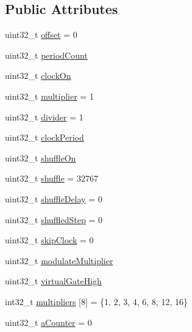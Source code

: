 \subsection*{Public Attributes}
\begin{DoxyCompactItemize}
\item 
uint32\+\_\+t \mbox{\hyperlink{class_dual_euclidean_a2dddcba8d52c9deba965c7751866c85f}{offset}} = 0
\item 
uint32\+\_\+t \mbox{\hyperlink{class_dual_euclidean_a64fd4a846ef9448e45ed252f0c272b59}{period\+Count}}
\item 
uint32\+\_\+t \mbox{\hyperlink{class_dual_euclidean_ad11fa3c6d1303467ebffae617dda5cc8}{clock\+On}}
\item 
uint32\+\_\+t \mbox{\hyperlink{class_dual_euclidean_a7ef5ab9221f00262bf015f7a67663f3e}{multiplier}} = 1
\item 
uint32\+\_\+t \mbox{\hyperlink{class_dual_euclidean_a9f1e0d3ea0d236c36c9ec259b4af6320}{divider}} = 1
\item 
uint32\+\_\+t \mbox{\hyperlink{class_dual_euclidean_a358adc877f7d9c9baa67928d75a667d2}{clock\+Period}}
\item 
uint32\+\_\+t \mbox{\hyperlink{class_dual_euclidean_a10b8d6a00cc86bde18bd612619138724}{shuffle\+On}}
\item 
uint32\+\_\+t \mbox{\hyperlink{class_dual_euclidean_a19521a4f42d79dcf5c88c02acb8fcc30}{shuffle}} = 32767
\item 
uint32\+\_\+t \mbox{\hyperlink{class_dual_euclidean_a3573c1d5e5484ebfccfad19b17aa5113}{shuffle\+Delay}} = 0
\item 
uint32\+\_\+t \mbox{\hyperlink{class_dual_euclidean_ab17ea18eb5504cffd255fbd926d3f41d}{shuffled\+Step}} = 0
\item 
uint32\+\_\+t \mbox{\hyperlink{class_dual_euclidean_a0cee123dd1067d2144f9c3c53e1d4707}{skip\+Clock}} = 0
\item 
uint32\+\_\+t \mbox{\hyperlink{class_dual_euclidean_aad2c789fc10f9bb42e36ade714cf8e32}{modulate\+Multiplier}}
\item 
uint32\+\_\+t \mbox{\hyperlink{class_dual_euclidean_a178d24471a08efe6149529d86b05fa1d}{virtual\+Gate\+High}}
\item 
int32\+\_\+t \mbox{\hyperlink{class_dual_euclidean_aab693c769cf1137e20e1b4db05ad1404}{multipliers}} \mbox{[}8\mbox{]} = \{1, 2, 3, 4, 6, 8, 12, 16\}
\item 
uint32\+\_\+t \mbox{\hyperlink{class_dual_euclidean_acf4499de05acdc7547c5acb21219ef4d}{a\+Counter}} = 0
\item 

\end{DoxyCompactItemize}
